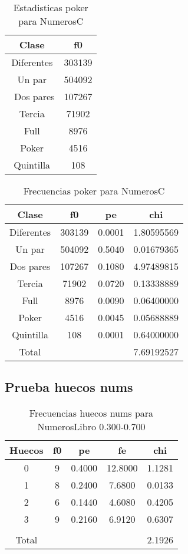 \documentclass[a4paper]{article}
\begin{document}
\begin{table}
\centering
\begin{tabular}{cc}
\\\hline
Clase&f0\\\hline
Diferentes&303139\\
Un par&504092\\\
Dos pares&107267\\
Tercia&71902\\
Full&8976\\
Poker&4516\\
Quintilla&108\\\hline
\end{tabular}
\caption{\label{tab:estadistpokerNumerosC}Estadisticas poker para NumerosC}
\end{table}

\begin{table}
\centering
\begin{tabular}{cccc}
\\\hline
Clase&f0&pe&chi\\\hline
Diferentes&303139&0.0001&1.80595569\\
Un par&504092&0.5040&0.01679365\\
Dos pares&107267&0.1080&4.97489815\\
Tercia&71902&0.0720&0.13338889\\
Full&8976&0.0090&0.06400000\\
Poker&4516&0.0045&0.05688889\\
Quintilla&108&0.0001&0.64000000\\\hline
Total & & &7.69192527\\\hline
\end{tabular}
\caption{\label{tab:frecpokerNumerosC}Frecuencias poker para NumerosC}
\end{table}


\subsection{Prueba huecos nums}
\begin{table}
\centering
\begin{tabular}{ccccc}
\\\hline
Huecos&f0&pe&fe&chi\\\hline
0&9&0.4000&12.8000&1.1281\\
1&8&0.2400&7.6800&0.0133\\
2&6&0.1440&4.6080&0.4205\\
3&9&0.2160&6.9120&0.6307\\
\\\hline
Total & & & &2.1926\\\hline
\end{tabular}
\caption{\label{tab:frechuecosnumsNumerosLibro}Frecuencias huecos nums para NumerosLibro 0.300-0.700}
\end{table}
\end{document}
